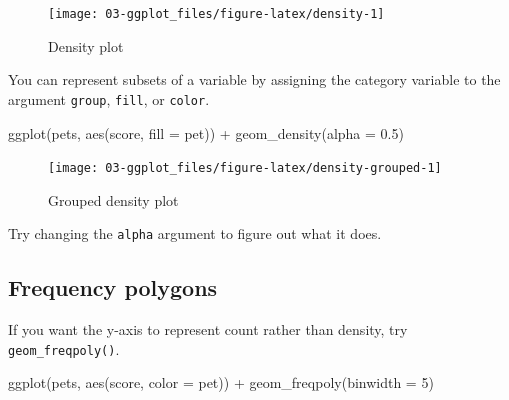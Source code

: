 \documentclass[
  oneside]{book}
\newenvironment{Shaded}{\begin{snugshade}}{\end{snugshade}}
\newcommand{\AttributeTok}[1]{\textcolor[rgb]{0.77,0.63,0.00}{#1}}
\newcommand{\DecValTok}[1]{\textcolor[rgb]{0.00,0.00,0.81}{#1}}
\newcommand{\FloatTok}[1]{\textcolor[rgb]{0.00,0.00,0.81}{#1}}
\newcommand{\FunctionTok}[1]{\textcolor[rgb]{0.00,0.00,0.00}{#1}}
\newcommand{\NormalTok}[1]{#1}
\newcommand{\SpecialCharTok}[1]{\textcolor[rgb]{0.00,0.00,0.00}{#1}}
\begin{document}
\begin{figure}

{\centering \texttt{[image: 03-ggplot\_files/figure-latex/density-1]} 

}

\caption{Density plot}\label{fig:density}
\end{figure}

You can represent subsets of a variable by assigning the category variable to the argument \texttt{group}, \texttt{fill}, or \texttt{color}.

\begin{Shaded}
\begin{Highlighting}[]
\FunctionTok{ggplot}\NormalTok{(pets, }\FunctionTok{aes}\NormalTok{(score, }\AttributeTok{fill =}\NormalTok{ pet)) }\SpecialCharTok{+}
  \FunctionTok{geom\_density}\NormalTok{(}\AttributeTok{alpha =} \FloatTok{0.5}\NormalTok{)}
\end{Highlighting}
\end{Shaded}

\begin{figure}

{\centering \texttt{[image: 03-ggplot\_files/figure-latex/density-grouped-1]} 

}

\caption{Grouped density plot}\label{fig:density-grouped}
\end{figure}

\begin{try}
Try changing the \texttt{alpha} argument to figure out what it does.

\end{try}

\hypertarget{geom_freqpoly}{%
\subsection{Frequency polygons}\label{geom_freqpoly}}

If you want the y-axis to represent count rather than density, try \texttt{geom\_freqpoly()}.

\begin{Shaded}
\begin{Highlighting}[]
\FunctionTok{ggplot}\NormalTok{(pets, }\FunctionTok{aes}\NormalTok{(score, }\AttributeTok{color =}\NormalTok{ pet)) }\SpecialCharTok{+}
  \FunctionTok{geom\_freqpoly}\NormalTok{(}\AttributeTok{binwidth =} \DecValTok{5}\NormalTok{)}
\end{Highlighting}
\end{Shaded}
\end{document}
